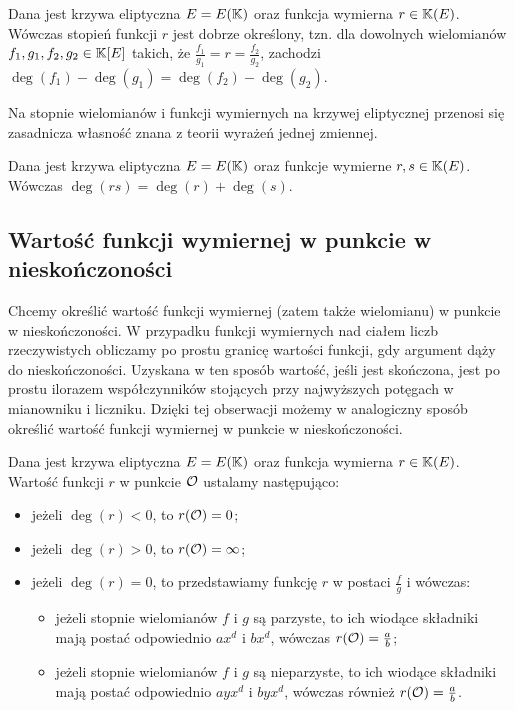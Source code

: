 \begin{theorem}
Dana jest krzywa eliptyczna $E = E(\mathbb{K})$
oraz funkcja wymierna $r \in \mathbb{K}(E)$.
Wówczas stopień funkcji $r$ jest dobrze określony,
tzn. dla dowolnych wielomianów $f_1, g_1, f_2, g_2 \in \mathbb{K}[E]$ takich,
że $\frac{f_1}{g_1} = r = \frac{f_2}{g_2}$,
zachodzi $\deg(f_1) - \deg(g_1) = \deg(f_2) - \deg(g_2)$.
\end{theorem}

Na stopnie wielomianów i funkcji wymiernych na krzywej eliptycznej
przenosi się zasadnicza własność znana z teorii wyrażeń jednej zmiennej.

\begin{theorem}
Dana jest krzywa eliptyczna $E = E(\mathbb{K})$
oraz funkcje wymierne $r, s \in \mathbb{K}(E)$.
Wówczas $\deg(rs) = \deg(r) + \deg(s)$.
\end{theorem}

\subsection*{Wartość funkcji wymiernej w punkcie w nieskończoności}

Chcemy określić wartość funkcji wymiernej (zatem także wielomianu)
w punkcie w nieskończoności.
W przypadku funkcji wymiernych nad ciałem liczb rzeczywistych
obliczamy po prostu granicę wartości funkcji,
gdy argument dąży do nieskończoności.
Uzyskana w ten sposób wartość, jeśli jest skończona,
jest po prostu ilorazem współczynników stojących przy najwyższych potęgach
w mianowniku i liczniku.
Dzięki tej obserwacji możemy w analogiczny sposób określić
wartość funkcji wymiernej w punkcie w nieskończoności.

\begin{definition}
Dana jest krzywa eliptyczna $E = E(\mathbb{K})$
oraz funkcja wymierna $r \in \mathbb{K}(E)$.
Wartość funkcji $r$ w punkcie $\mathcal{O}$
ustalamy następująco:
\begin{itemize}
\item jeżeli $\deg(r) < 0$, to $r(\mathcal{O}) = 0$;
\item jeżeli $\deg(r) > 0$, to $r(\mathcal{O}) = \infty$;
\item jeżeli $\deg(r) = 0$,
to przedstawiamy funkcję $r$ w postaci $\frac{f}{g}$ i wówczas:
\begin{itemize}
\item jeżeli stopnie wielomianów $f$ i $g$ są parzyste,
to ich wiodące składniki mają postać odpowiednio $ax^d$ i $bx^d$,
wówczas $r(\mathcal{O}) = \frac{a}{b}$;
\item jeżeli stopnie wielomianów $f$ i $g$ są nieparzyste,
to ich wiodące składniki mają postać odpowiednio $ayx^d$ i $byx^d$,
wówczas również $r(\mathcal{O}) = \frac{a}{b}$.
\end{itemize}
\end{itemize}
\end{definition}

